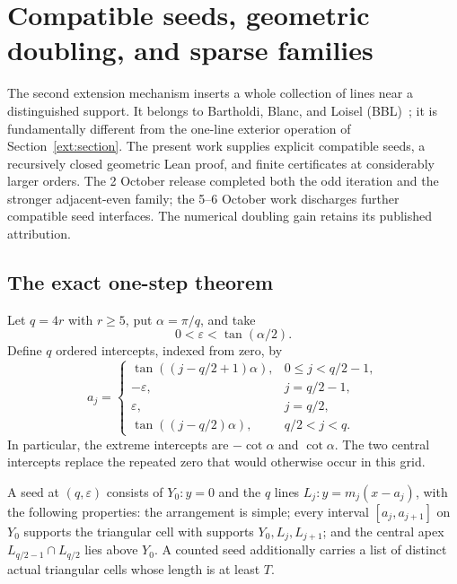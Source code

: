 \section{Compatible seeds, geometric doubling, and sparse families}
\label{fam:section}

The second extension mechanism inserts a whole collection of lines near
a distinguished support.  It belongs to Bartholdi, Blanc, and Loisel
(BBL)~\cite{bbl2008}; it is fundamentally different from the one-line
exterior operation of Section~\ref{ext:section}.  The present work supplies
explicit compatible seeds, a recursively closed geometric Lean proof, and
finite certificates at considerably larger orders. The 2 October release
completed both the odd iteration and the stronger adjacent-even family;
the 5--6 October work discharges further compatible seed interfaces.
The numerical doubling gain retains its published attribution.

\subsection{The exact one-step theorem}

Let $q=4r$ with $r\geq5$, put $\alpha=\pi/q$, and take
\begin{equation}
  0<\varepsilon<\tan(\alpha/2).
  \label{fam:epsilon}
\end{equation}
Define $q$ ordered intercepts, indexed from zero, by
\begin{equation}
 a_j=
 \begin{cases}
 \tan((j-q/2+1)\alpha),&0\leq j<q/2-1,\\
 -\varepsilon,&j=q/2-1,\\
 \varepsilon,&j=q/2,\\
 \tan((j-q/2)\alpha),&q/2<j<q.
 \end{cases}
 \label{fam:old-grid}
\end{equation}
In particular, the extreme intercepts are $-\cot\alpha$ and
$\cot\alpha$.  The two central intercepts replace the repeated zero that
would otherwise occur in this grid.

\begin{definition}
\label{fam:compatible}
A seed at $(q,\varepsilon)$ consists of $Y_0:y=0$ and the $q$ lines
$L_j:y=m_j(x-a_j)$, with the following properties: the arrangement is
simple; every interval $[a_j,a_{j+1}]$ on $Y_0$ supports the triangular
cell with supports $Y_0,L_j,L_{j+1}$; and the central apex
$L_{q/2-1}\cap L_{q/2}$ lies above $Y_0$.  A counted seed additionally
carries a list of distinct actual triangular cells whose length is at
least $T$.
\end{definition}

